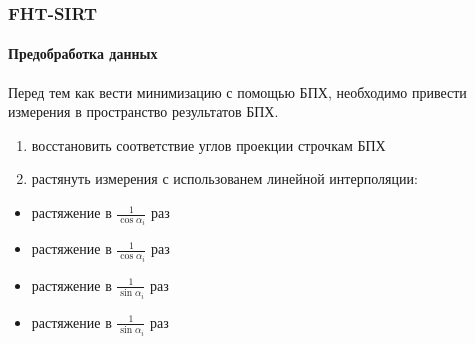 \begin{frame}
\frametitle{FHT-SIRT}
\framesubtitle{Предобработка данных}

Перед тем как вести минимизацию с помощью БПХ, необходимо привести измерения в пространство результатов БПХ.
\begin{enumerate}
  \item восстановить соответствие углов проекции строчкам БПХ
  \item растянуть измерения с использованем линейной интерполяции:
\end{enumerate}

\hspace*{2cm}
  \begin{itemize}
    \item {} растяжение в $\frac 1 {\cos \alpha_i}$ раз
    \item {} растяжение в $\frac 1 {\cos \alpha_i}$ раз
    \item {} растяжение в $\frac 1 {\sin \alpha_i}$ раз
    \item {} растяжение в $\frac 1 {\sin \alpha_i}$ раз
  \end{itemize}

\end{frame}

